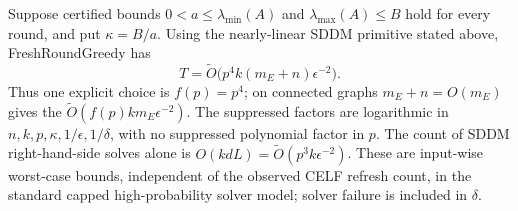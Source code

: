 \begin{theorem}
\label{thm:freshcost}
Suppose certified bounds $0<a\leq\lambda_{\min}(A)$ and
$\lambda_{\max}(A)\leq B$ hold for every round, and put $\kappa=B/a$.
Using the nearly-linear SDDM primitive stated above, FreshRoundGreedy has
\begin{equation}\label{eq:freshcost}
 T=\widetilde O\bigl(p^4 k(m_E+n)\epsilon^{-2}\bigr).
\end{equation}
Thus one explicit choice is $f(p)=p^4$; on connected graphs
$m_E+n=O(m_E)$ gives the
$\widetilde O(f(p)km_E\epsilon^{-2})$.
The suppressed factors are logarithmic in
$n,k,p,\kappa,1/\epsilon,1/\delta$, with no suppressed polynomial
factor in $p$. The count of SDDM right-hand-side solves alone is
$O(kdL)=\widetilde O(p^3k\epsilon^{-2})$.
These are input-wise worst-case bounds, independent of the observed
CELF refresh count, in the standard capped high-probability solver
model; solver failure is included in $\delta$.
\end{theorem}
